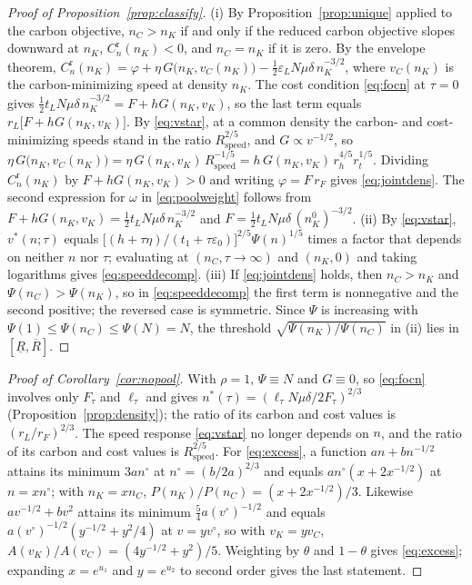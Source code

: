 \documentclass[11pt]{article}
\theoremstyle{definition}
\theoremstyle{remark}
\theoremstyle{plain}
\begin{document}
\begin{proof}[Proof of Proposition~\ref{prop:classify}]
(i) By Proposition~\ref{prop:unique} applied to the carbon objective, $n_C>n_K$ if and only if the reduced
carbon objective slopes downward at $n_K$, $C^{\mathrm r}_n(n_K)<0$, and $n_C=n_K$ if it is zero. By the
envelope theorem, $C^{\mathrm r}_n(n_K)=\varphi+\eta\,G\big(n_K,v_C(n_K)\big)
-\tfrac12\varepsilon_LN\mu\delta\,n_K^{-3/2}$, where $v_C(n_K)$ is the carbon-minimizing speed at density
$n_K$. The cost condition \eqref{eq:focn} at $\tau=0$ gives $\tfrac12t_LN\mu\delta\,n_K^{-3/2}=F+hG(n_K,v_K)$,
so the last term equals $r_L\big[F+hG(n_K,v_K)\big]$. By \eqref{eq:vstar}, at a common density the carbon- and
cost-minimizing speeds stand in the ratio $R_{\mathrm{speed}}^{2/5}$, and $G\propto v^{-1/2}$, so
$\eta\,G\big(n_K,v_C(n_K)\big)=\eta\,G(n_K,v_K)\,R_{\mathrm{speed}}^{-1/5}=h\,G(n_K,v_K)\,r_h^{4/5}r_t^{1/5}$.
Dividing $C^{\mathrm r}_n(n_K)$ by $F+hG(n_K,v_K)>0$ and writing $\varphi=F\,r_F$ gives \eqref{eq:jointdens}.
The second expression for $\omega$ in \eqref{eq:poolweight} follows from $F+hG(n_K,v_K)=\tfrac12t_LN\mu\delta\,
n_K^{-3/2}$ and $F=\tfrac12t_LN\mu\delta\,(n_K^0)^{-3/2}$.
(ii) By \eqref{eq:vstar}, $v^*(n;\tau)$ equals $\big[(h+\tau\eta)/(t_1+\tau\varepsilon_0)\big]^{2/5}\Psi(n)^{1/5}$
times a factor that depends on neither $n$ nor $\tau$; evaluating at $(n_C,\tau\to\infty)$ and $(n_K,0)$ and
taking logarithms gives \eqref{eq:speeddecomp}.
(iii) If \eqref{eq:jointdens} holds, then $n_C>n_K$ and $\Psi(n_C)>\Psi(n_K)$, so in \eqref{eq:speeddecomp} the
first term is nonnegative and the second positive; the reversed case is symmetric. Since $\Psi$ is increasing
with $\Psi(1)\le\Psi(n_C)\le\Psi(N)=N$, the threshold $\sqrt{\Psi(n_K)/\Psi(n_C)}$ in (ii) lies in
$[\underline R,\overline R]$.
\end{proof}

\begin{proof}[Proof of Corollary~\ref{cor:nopool}]
With $\rho=1$, $\Psi\equiv N$ and $G\equiv0$, so \eqref{eq:focn} involves only $F_\tau$ and $\ell_\tau$ and
gives $n^*(\tau)=(\ell_\tau N\mu\delta/2F_\tau)^{2/3}$ (Proposition~\ref{prop:density}); the ratio of its
carbon and cost values is $(r_L/r_F)^{2/3}$. The speed response \eqref{eq:vstar} no longer depends on $n$, and
the ratio of its carbon and cost values is $R_{\mathrm{speed}}^{2/5}$. For \eqref{eq:excess}, a function
$an+bn^{-1/2}$ attains its minimum $3an^\circ$ at $n^\circ=(b/2a)^{2/3}$ and equals $an^\circ(x+2x^{-1/2})$ at
$n=xn^\circ$; with $n_K=xn_C$, $P(n_K)/P(n_C)=(x+2x^{-1/2})/3$. Likewise $av^{-1/2}+bv^2$ attains its minimum
$\tfrac54a(v^\circ)^{-1/2}$ and equals $a(v^\circ)^{-1/2}(y^{-1/2}+y^2/4)$ at $v=yv^\circ$, so with
$v_K=yv_C$, $A(v_K)/A(v_C)=(4y^{-1/2}+y^2)/5$. Weighting by $\theta$ and $1-\theta$ gives \eqref{eq:excess};
expanding $x=e^{u_1}$ and $y=e^{u_2}$ to second order gives the last statement.
\end{proof}
\end{document}
